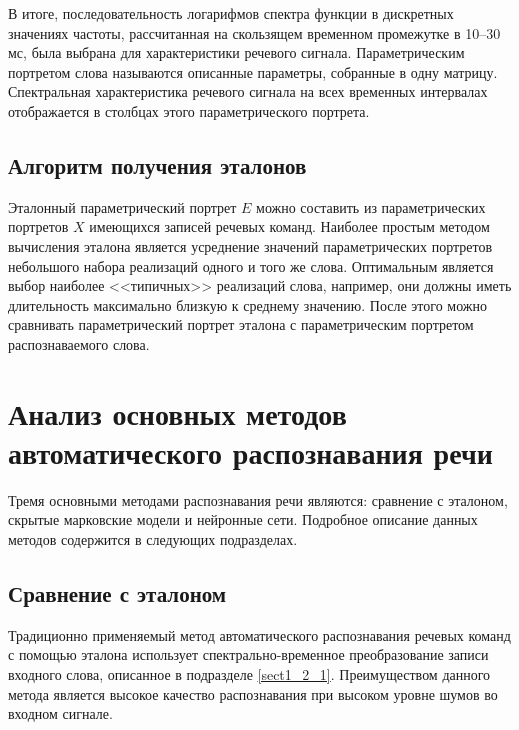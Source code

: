 В итоге, последовательность логарифмов спектра функции в дискретных значениях частоты, рассчитанная на скользящем временном промежутке в 10--30 мс, была выбрана для характеристики речевого сигнала.
Параметрическим портретом слова называются описанные параметры, собранные в одну матрицу.
Спектральная характеристика речевого сигнала на всех временных интервалах отображается в столбцах этого параметрического портрета.


\subsection{Алгоритм получения эталонов} \label{sect1_2_2}

Эталонный параметрический портрет $E$ можно составить из параметрических портретов $X$ имеющихся записей речевых команд.
Наиболее простым методом вычисления эталона является усреднение значений параметрических портретов небольшого набора реализаций одного и того же слова.
Оптимальным является выбор наиболее <<типичных>> реализаций слова, например, они должны иметь длительность максимально близкую к среднему значению.
После этого можно сравнивать параметрический портрет эталона с параметрическим портретом распознаваемого слова.


\section{Анализ основных методов автоматического распознавания речи} \label{sect1_3}

Тремя основными методами распознавания речи являются: сравнение с эталоном, скрытые марковские модели и нейронные сети.
Подробное описание данных методов содержится в следующих подразделах.


\subsection{Сравнение с эталоном} \label{sect1_3_1}

Традиционно применяемый метод автоматического распознавания речевых команд с помощью эталона использует спектрально-временное преобразование записи входного слова, описанное в подразделе \ref{sect1_2_1}.
Преимуществом данного метода является высокое качество распознавания при высоком уровне шумов во входном сигнале.

